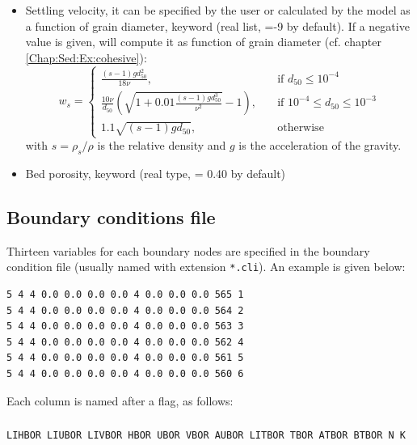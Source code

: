 \begin{itemize}
\item Settling velocity, it can be specified by the user or calculated by the model as a function of grain diameter, keyword  (real list, =-9 by default). If a negative value is given, \gaia{} will compute it as function of grain diameter (cf. chapter \ref{Chap:Sed:Ex:cohesive}):
  \begin{equation*}
w_{s} = \left\{\begin{array}{ll}
\displaystyle
\frac{(s-1)g d_{50}^2}{18\nu}, & \quad \text{if } d_{50} \leq 10^{-4} \\
\displaystyle
\frac{10\nu}{d_{50}} \left(\sqrt{1+0.01\frac{(s-1)gd_{50}^3}{\nu^2}}-1\right), & \quad \text{if } 10^{-4} \leq d_{50} \leq 10^{-3}\\
\displaystyle
1.1 \sqrt{(s-1)gd_{50}}, & \quad \text{otherwise}
\end{array}
\right.
\end{equation*}
with $s=\rho_{s}/\rho$ is the relative density and $g$ is the acceleration of the gravity.%
\item Bed porosity, keyword  (real type, {\ttfamily = 0.40} by default)
\end{itemize}



\subsection{Boundary conditions file}\label{sec:flags}
Thirteen variables for each boundary nodes are specified in the boundary condition file (usually named with extension \texttt{*.cli}). An example is given below:

\begin{lstlisting}[frame=trBL]
5 4 4 0.0 0.0 0.0 0.0 4 0.0 0.0 0.0 565 1
5 4 4 0.0 0.0 0.0 0.0 4 0.0 0.0 0.0 564 2
5 4 4 0.0 0.0 0.0 0.0 4 0.0 0.0 0.0 563 3
5 4 4 0.0 0.0 0.0 0.0 4 0.0 0.0 0.0 562 4
5 4 4 0.0 0.0 0.0 0.0 4 0.0 0.0 0.0 561 5
5 4 4 0.0 0.0 0.0 0.0 4 0.0 0.0 0.0 560 6
\end{lstlisting}

Each column is named after a flag, as follows:
\subsubsection{}
\begin{lstlisting}[frame=trBL]
LIHBOR LIUBOR LIVBOR HBOR UBOR VBOR AUBOR LITBOR TBOR ATBOR BTBOR N K
\end{lstlisting}
